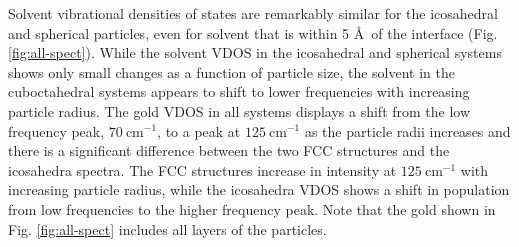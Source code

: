 


Solvent vibrational densities of states are remarkably similar for the
icosahedral and spherical particles, even for solvent that is within 5
\AA\ of the interface (Fig. \ref{fig:all-spect}). 
While the solvent VDOS in the icosahedral
and spherical systems shows only small changes as a function of
particle size, the solvent in the cuboctahedral systems appears to
shift to lower frequencies with increasing particle radius.  The gold
VDOS in all systems displays a shift from the low frequency peak,
$70 \mathrm{~cm}^{-1}$, to a peak at $125 \mathrm{~cm}^{-1}$ as the
particle radii increases and there is a significant difference between
the two FCC structures and the icosahedra spectra.  The FCC structures
increase in intensity at $125 \mathrm{~cm}^{-1}$ with increasing
particle radius, while the icosahedra VDOS shows a shift in population
from low frequencies to the higher frequency peak.  Note that the gold
shown in Fig. \ref{fig:all-spect} includes all layers of the
particles.

